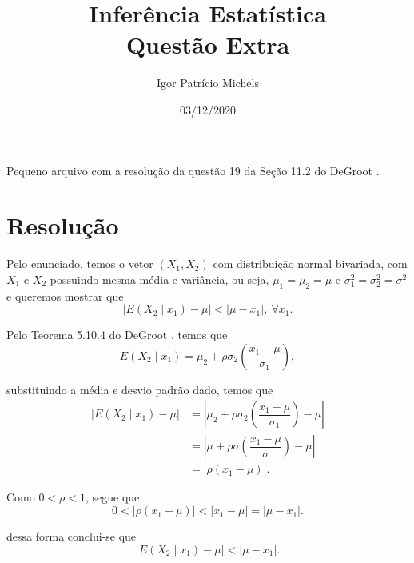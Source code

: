 \documentclass{article}
\title{Inferência Estatística \\ Questão Extra}
\author{Igor Patrício Michels}
\date{03/12/2020}
\begin{document}
\maketitle

Pequeno arquivo com a resolução da questão 19 da Seção 11.2 do DeGroot \cite{degroot}.

\section*{Resolução}

Pelo enunciado, temos o vetor $\left(X_1, X_2\right)$ com distribuição normal bivariada, com $X_1$ e $X_2$ possuindo mesma média e variância, ou seja, $\mu_1 = \mu_2 = \mu$ e $\sigma^2_1 = \sigma^2_2 = \sigma^2$ e queremos mostrar que
\[\left|E\left(X_2 \mid x_1\right) - \mu\right| < \left|\mu - x_1\right|, ~\forall x_1.\]

Pelo Teorema 5.10.4 do DeGroot \cite{degroot}, temos que
\[E\left(X_2 \mid x_1\right) = \mu_2 + \rho\sigma_2\left(\dfrac{x_1 - \mu}{\sigma_1}\right),\]

\noindent substituindo a média e desvio padrão dado, temos que
\begin{equation*}
    \begin{split}
        \left|E\left(X_2 \mid x_1\right) - \mu\right| & = \left|\mu_2 + \rho\sigma_2\left(\dfrac{x_1 - \mu}{\sigma_1}\right) - \mu\right| \\
        & = \left|\mu + \rho\sigma\left(\dfrac{x_1 - \mu}{\sigma}\right) - \mu\right| \\
        & = \left|\rho \left(x_1 - \mu\right)\right|.
    \end{split}
\end{equation*}

Como $0 < \rho < 1$, segue que
\[0 < \left|\rho \left(x_1 - \mu\right)\right| < \left|x_1 - \mu\right| = \left|\mu - x_1\right|.\]

\noindent dessa forma conclui-se que
\[\left|E\left(X_2 \mid x_1\right) - \mu\right| < \left|\mu - x_1\right|.\]

\printbibliography
\end{document}
